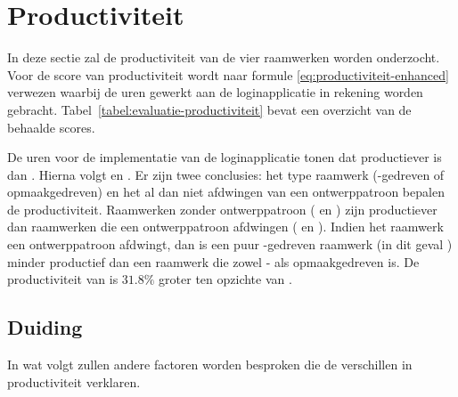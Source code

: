 \section{Productiviteit}
\label{sec:evaluatie-productiviteit}

In deze sectie zal de productiviteit van de vier raamwerken worden onderzocht.
Voor de score van productiviteit wordt naar formule \ref{eq:productiviteit-enhanced} verwezen waarbij de uren gewerkt aan de loginapplicatie in rekening worden gebracht. 
Tabel~\ref{tabel:evaluatie-productiviteit} bevat een overzicht van de behaalde scores.

\begin{table}
  \centering
  \caption{Overzicht van productiviteit.}
  \label{tabel:evaluatie-productiviteit}
\end{table}

De uren voor de implementatie van de loginapplicatie tonen dat \jqm{} productiever is dan \lungo{}. 
Hierna volgt \kendo{} en \st{}.
Er zijn twee conclusies: het type raamwerk (\js-gedreven of opmaakgedreven) en het al dan niet afdwingen van een ontwerppatroon bepalen de productiviteit.
Raamwerken zonder ontwerppatroon (\jqm{} en \lungo{}) zijn productiever dan raamwerken die een ontwerppatroon afdwingen (\st{} en \kendo{}).
Indien het raamwerk een ontwerppatroon afdwingt, dan is een puur \js{}-gedreven raamwerk (in dit geval \st{}) minder productief dan een raamwerk die zowel \js{}- als opmaakgedreven is.
De productiviteit van \kendo{} is $31.8\%$ groter ten opzichte van \st{}.

\subsection{Duiding}
In wat volgt zullen andere factoren worden besproken die de verschillen in productiviteit verklaren.

